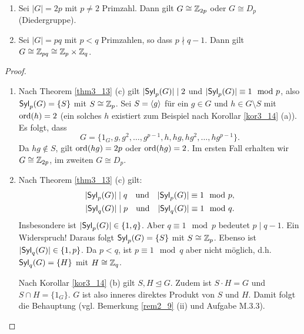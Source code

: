 \begin{kor}\label{kor3_15}
	\begin{enumerate}[label=(\alph*)]
		\item Sei $|G| = 2p$ mit $p \neq 2$ Primzahl. Dann gilt $G \cong \mathbb{Z}_{2p}$ oder $G \cong D_p$ (Diedergruppe).
		\item Sei $|G| = pq$ mit $p<q$ Primzahlen, so dass $p \nmid q-1$. Dann gilt $G \cong \mathbb{Z}_{pq} \cong \mathbb{Z}_p \times \mathbb{Z}_q$. 
	\end{enumerate}
\end{kor}
\begin{proof}
	\begin{enumerate}[label=(\alph*)]
		\item Nach Theorem \ref{thm3_13} (c) gilt $|\mathsf{Syl}_p(G)| \mid 2$ und $|\mathsf{Syl}_p(G)| \equiv 1 \mod p$, also $\mathsf{Syl}_p(G) = \{S\}$ mit $S \cong \mathbb{Z}_p$. Sei $S = \langle g \rangle$ für ein $g \in G$ und $h \in G \setminus S$ mit $\mathrm{ord}(h) = 2$ (ein solches $h$ existiert zum Beispiel nach Korollar \ref{kor3_14} (a)). Es folgt, dass
		\[G = \{1_G, g, g^2, \dots, g^{p-1}, h, hg, hg^2, \dots, hg^{p-1}\}.\]
		Da $hg \notin S$, gilt $\mathrm{ord}(hg) = 2p$ oder $\mathrm{ord}(hg) = 2$. Im ersten Fall erhalten wir $G \cong \mathbb{Z}_{2p}$, im zweiten $G \cong D_p$.
		\item Nach Theorem \ref{thm3_13} (c) gilt:
		\begin{align*}
			|\mathsf{Syl}_p(G)| \mid q \quad\text{und}\quad |\mathsf{Syl}_p(G)| \equiv 1 \mod p,\\
			|\mathsf{Syl}_q(G)| \mid p \quad\text{und}\quad |\mathsf{Syl}_q(G)| \equiv 1 \mod q.
		\end{align*}
		Insbesondere ist $|\mathsf{Syl}_p(G)| \in \{1,q\}$. Aber $q \equiv 1 \mod p$ bedeutet $p \mid q-1$. Ein Widerspruch!
		Daraus folgt $\mathsf{Syl}_p(G) = \{S\}$ mit $S \cong \mathbb{Z}_p$. Ebenso ist $|\mathsf{Syl}_q(G)| \in \{1,p\}$. Da $p<q$, ist $p \equiv 1 \mod q$ aber nicht möglich, d.h. $\mathsf{Syl}_q(G) = \{H\}$ mit $H \cong \mathbb{Z}_q$.
		
		Nach Korollar \ref{kor3_14} (b) gilt $S,H \unlhd G$. Zudem ist $S \cdot H = G$ und $S \cap H = \{1_G\}$. $G$ ist also inneres direktes Produkt von $S$ und $H$. Damit folgt die Behauptung (vgl. Bemerkung \ref{rem2_9} (ii) und Aufgabe M.3.3).
	\end{enumerate}
\end{proof}
